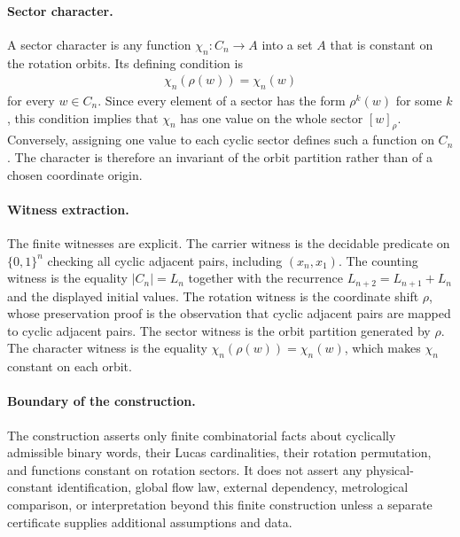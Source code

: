 \paragraph{Sector character.}
A sector character is any function $\chi_n:C_n\to A$ into a set $A$ that is constant on the rotation orbits. Its defining condition is
$$
\begin{aligned}
\chi_n(\rho(w))=\chi_n(w)
\end{aligned}
$$
for every $w\in C_n$. Since every element of a sector has the form $\rho^k(w)$ for some $k$, this condition implies that $\chi_n$ has one value on the whole sector $[w]_{\rho}$. Conversely, assigning one value to each cyclic sector defines such a function on $C_n$. The character is therefore an invariant of the orbit partition rather than of a chosen coordinate origin.

\paragraph{Witness extraction.}
The finite witnesses are explicit. The carrier witness is the decidable predicate on $\{0,1\}^n$ checking all cyclic adjacent pairs, including $(x_n,x_1)$. The counting witness is the equality $|C_n|=L_n$ together with the recurrence $L_{n+2}=L_{n+1}+L_n$ and the displayed initial values. The rotation witness is the coordinate shift $\rho$, whose preservation proof is the observation that cyclic adjacent pairs are mapped to cyclic adjacent pairs. The sector witness is the orbit partition generated by $\rho$. The character witness is the equality $\chi_n(\rho(w))=\chi_n(w)$, which makes $\chi_n$ constant on each orbit.

\paragraph{Boundary of the construction.}
The construction asserts only finite combinatorial facts about cyclically admissible binary words, their Lucas cardinalities, their rotation permutation, and functions constant on rotation sectors. It does not assert any physical-constant identification, global flow law, external dependency, metrological comparison, or interpretation beyond this finite construction unless a separate certificate supplies additional assumptions and data.
